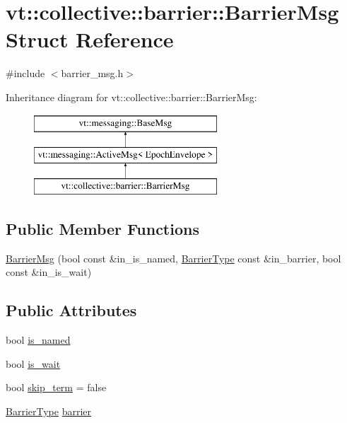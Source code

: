 \hypertarget{structvt_1_1collective_1_1barrier_1_1_barrier_msg}{}\section{vt\+:\+:collective\+:\+:barrier\+:\+:Barrier\+Msg Struct Reference}
\label{structvt_1_1collective_1_1barrier_1_1_barrier_msg}


{\ttfamily \#include $<$barrier\+\_\+msg.\+h$>$}

Inheritance diagram for vt\+:\+:collective\+:\+:barrier\+:\+:Barrier\+Msg\+:\begin{figure}[H]
\begin{center}
\leavevmode
\includegraphics[height=3.000000cm]{structvt_1_1collective_1_1barrier_1_1_barrier_msg}
\end{center}
\end{figure}
\subsection*{Public Member Functions}
\begin{DoxyCompactItemize}
\item 
\hyperlink{structvt_1_1collective_1_1barrier_1_1_barrier_msg_ace4c557dedf54a63ed52ea92ff06a072}{Barrier\+Msg} (bool const \&in\+\_\+is\+\_\+named, \hyperlink{namespacevt_a25e481f0d6bbc7204db23d1c87a62e77}{Barrier\+Type} const \&in\+\_\+barrier, bool const \&in\+\_\+is\+\_\+wait)
\end{DoxyCompactItemize}
\subsection*{Public Attributes}
\begin{DoxyCompactItemize}
\item 
bool \hyperlink{structvt_1_1collective_1_1barrier_1_1_barrier_msg_ac5fc85cc8e5a7d8ad5a41139100971e1}{is\+\_\+named}
\item 
bool \hyperlink{structvt_1_1collective_1_1barrier_1_1_barrier_msg_a034e88ab8abfea2e3fa02beae47d5285}{is\+\_\+wait}
\item 
bool \hyperlink{structvt_1_1collective_1_1barrier_1_1_barrier_msg_a8fbd915e535fbf2e6302617adff036bc}{skip\+\_\+term} = false
\item 
\hyperlink{namespacevt_a25e481f0d6bbc7204db23d1c87a62e77}{Barrier\+Type} \hyperlink{structvt_1_1collective_1_1barrier_1_1_barrier_msg_ad07b4e665f05847318343b3b17e0c554}{barrier}
\end{DoxyCompactItemize}
